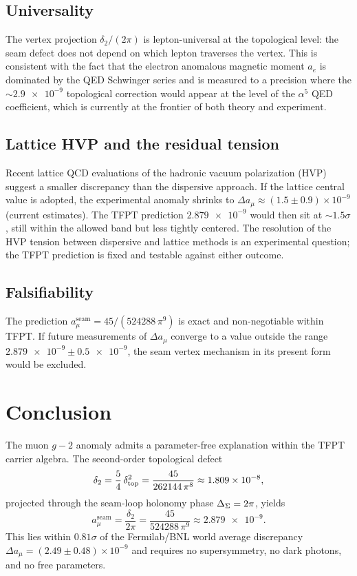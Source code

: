\subsection{Universality}

The vertex projection $\delta_2/(2\pi)$ is lepton-universal at the topological
level: the seam defect does not depend on which lepton traverses the vertex.
This is consistent with the fact that the electron anomalous magnetic
moment $a_e$ is dominated by the QED Schwinger series and is measured to a
precision where the $\sim\!\num{2.9e-9}$ topological correction would appear
at the level of the $\alpha^5$ QED coefficient, which is currently at the
frontier of both theory and experiment.

\subsection{Lattice HVP and the residual tension}

Recent lattice QCD evaluations of the hadronic vacuum polarization
(HVP)~\cite{BMW2021,RBC2024} suggest a smaller discrepancy than the
dispersive approach. If the lattice central value is adopted, the
experimental anomaly shrinks to $\Delta a_\mu\approx(1.5\pm0.9)\times10^{-9}$
(current estimates). The TFPT prediction $\num{2.879e-9}$ would then sit
at $\sim\!1.5\sigma$, still within the allowed band but less tightly centered.
The resolution of the HVP tension between dispersive and lattice methods is
an experimental question; the TFPT prediction is fixed and testable against
either outcome.

\subsection{Falsifiability}

The prediction $a_\mu^{\mathrm{seam}}=45/(524288\,\pi^9)$ is exact and
non-negotiable within TFPT. If future measurements of $\Delta a_\mu$ converge
to a value outside the range $\num{2.879e-9}\pm\num{0.5e-9}$, the seam
vertex mechanism in its present form would be excluded.

\section{Conclusion}\label{sec:conclusion}

The muon $g-2$ anomaly admits a parameter-free explanation within the
TFPT carrier algebra. The second-order topological defect
\[
\delta_2
=
\frac54\,\delta_{\mathrm{top}}^2
=
\frac{45}{262144\,\pi^8}
\approx\num{1.809e-8},
\]
projected through the seam-loop holonomy phase $\Delta_\Sigma=2\pi$, yields
\[
\boxed{
a_\mu^{\mathrm{seam}}
=
\frac{\delta_2}{2\pi}
=
\frac{45}{524288\,\pi^9}
\approx\num{2.879e-9}.
}
\]
This lies within $0.81\sigma$ of the Fermilab/BNL world average discrepancy
$\Delta a_\mu=(2.49\pm0.48)\times10^{-9}$ and requires no supersymmetry, no
dark photons, and no free parameters.

